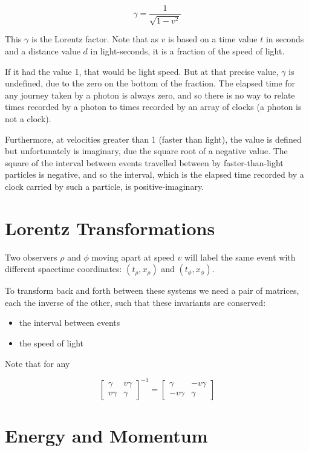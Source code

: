 $$\gamma = \frac{1}{\sqrt{1 - v^2}}$$

This $\gamma$ is the Lorentz factor. Note that as $v$ is based on a time value $t$ in seconds and a distance value $d$ in light-seconds, it is a fraction of the speed of light.

If it had the value 1, that would be light speed. But at that precise value, $\gamma$ is undefined, due to the zero on the bottom of the fraction. The elapsed time for any journey taken by a photon is always zero, and so there is no way to relate times recorded by a photon to times recorded by an array of clocks (a photon is not a clock).

Furthermore, at velocities greater than 1 (faster than light), the value is defined but unfortunately is imaginary, due the square root of a negative value. The square of the interval between events travelled between by faster-than-light particles is negative, and so the interval, which is the elapsed time recorded by a clock carried by such a particle, is positive-imaginary.

\section{Lorentz Transformations}

Two observers $\rho$ and $\phi$ moving apart at speed $v$ will label the same event with different spacetime coordinates: $(t_\rho, x_\rho)$ and $(t_\phi, x_\phi)$.

To transform back and forth between these systems we need a pair of matrices, each the inverse of the other, such that these invariants are conserved:

\begin{itemize}
    \item the interval between events
    \item the speed of light
\end{itemize}

Note that for any

$$\begin{bmatrix}\gamma & v\gamma \\ v\gamma & \gamma\end{bmatrix}^{-1} = \begin{bmatrix}\gamma & -v\gamma \\ -v\gamma & \gamma\end{bmatrix}$$

\section{Energy and Momentum}

